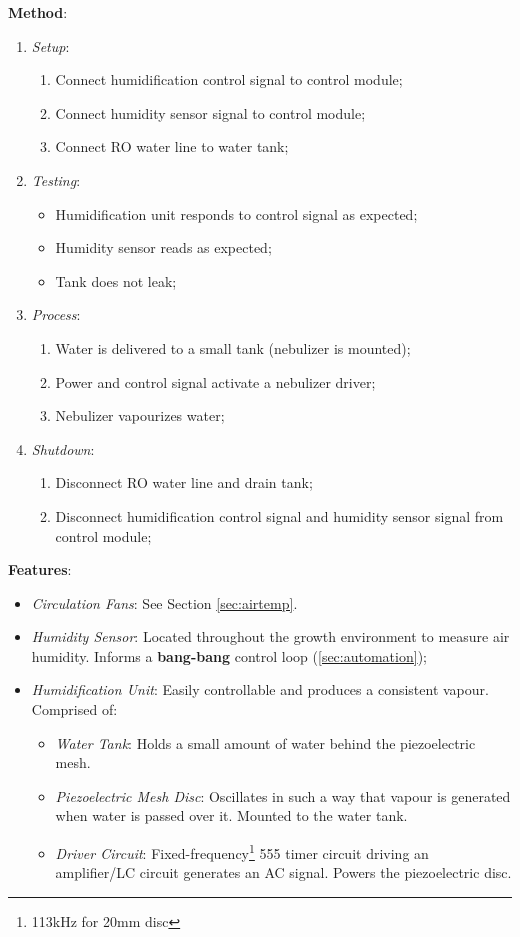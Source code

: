 \documentclass{report}
\begin{document}
\textbf{Method}:
\begin{enumerate}
    \item \textit{Setup}:
    \begin{enumerate}
        \item Connect humidification control signal to control module;
        \item Connect humidity sensor signal to control module;
        \item Connect RO water line to water tank;
    \end{enumerate}
    \item \textit{Testing}:
    \begin{itemize}
        \item Humidification unit responds to control signal as expected;
        \item Humidity sensor reads as expected;
        \item Tank does not leak;
    \end{itemize}
    \item \textit{Process}:
    \begin{enumerate}
        \item Water is delivered to a small tank (nebulizer is mounted);
        \item Power and control signal activate a nebulizer driver;
        \item Nebulizer vapourizes water;
    \end{enumerate}
    \item \textit{Shutdown}:
    \begin{enumerate}
        \item Disconnect RO water line and drain tank;
        \item Disconnect humidification control signal and humidity sensor signal from control module;
    \end{enumerate}
\end{enumerate}

\textbf{Features}:
\begin{itemize}
    \item \textit{Circulation Fans}: See Section \ref{sec:airtemp}.
    \item \textit{Humidity Sensor}: Located throughout the growth environment to measure air humidity. Informs a \textbf{bang-bang} control loop (\ref{sec:automation});
    \item \textit{Humidification Unit}: Easily controllable and produces a consistent vapour. Comprised of:
    \begin{itemize}
        \item \textit{Water Tank}: Holds a small amount of water behind the piezoelectric mesh.
        \item \textit{Piezoelectric Mesh Disc}: Oscillates in such a way that vapour is generated when water is passed over it. Mounted to the water tank.
        \item \textit{Driver Circuit}: Fixed-frequency\footnote{113kHz for 20mm disc} 555 timer circuit driving an amplifier/LC circuit generates an AC signal. Powers the piezoelectric disc.
    \end{itemize}
\end{itemize}
\end{document}
